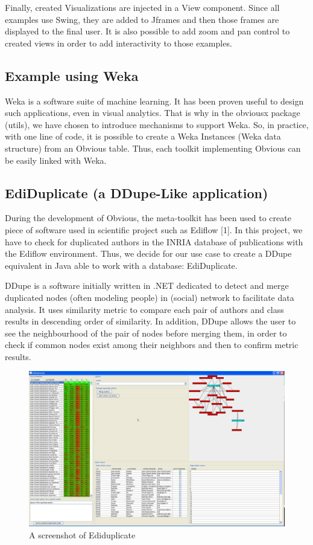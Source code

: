 Finally,  created Visualizations are injected in a View component. Since all examples use Swing, they are added to Jframes and then those frames are displayed to the final user. It is also possible to add zoom and pan control to created views in order to add interactivity to those examples.

\subsection{Example using Weka}

Weka is a software suite of machine learning. It has been proven useful to design such applications, even in visual analytics. That is why in the obviousx package (utils), we have chosen to introduce mechanisms to support Weka. So, in practice, with one line of code, it is possible to create a Weka Instances (Weka data structure) from an Obvious table. Thus, each toolkit implementing Obvious can be easily linked with Weka.

\subsection{EdiDuplicate (a DDupe-Like application)}

During the development of Obvious, the meta-toolkit has been used to create piece of software used in scientific project such as Ediflow [1]. In this project, we have to check for  duplicated authors in the INRIA database of publications with the Ediflow environment. Thus, we decide for our use case to create a DDupe equivalent in Java able to work with a database: EdiDuplicate.

DDupe is a software initially written in .NET dedicated to detect and merge duplicated nodes (often modeling people)  in (social) network to facilitate data analysis. It uses similarity metric to compare each pair  of authors and class results in descending order of similarity. In addition, DDupe allows the user to see the neighbourhood of the pair of nodes before merging them, in order to check if common nodes exist among their neighbors and then to confirm metric results.

\begin{figure}
\includegraphics[width=\columnwidth]{figures/ediduplicate}
\caption{A screenshot of Ediduplicate}
\label{fig:ediduplicate}
\end{figure}

